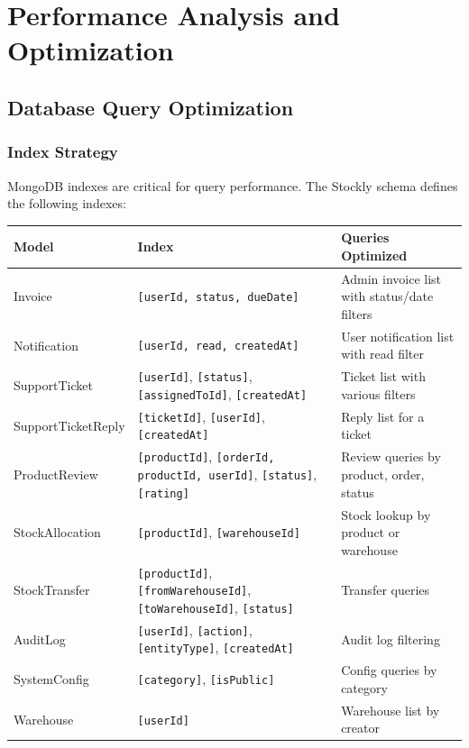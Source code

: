 \documentclass[12pt,onecolumn]{IEEEtran}
\let\oldsection\section
\renewcommand{\section}{\clearpage\oldsection}
\begin{document}
\section{Performance Analysis and Optimization}


\subsection{Database Query Optimization}

\subsubsection{Index Strategy}

MongoDB indexes are critical for query performance. The Stockly schema defines the following indexes:

\begin{center}
\begin{longtable}{llp{6cm}}
  \toprule
  \textbf{Model} & \textbf{Index} & \textbf{Queries Optimized} \\
  \midrule
  \endhead
  Invoice        & \texttt{[userId, status, dueDate]} & Admin invoice list with status/date filters \\
  Notification   & \texttt{[userId, read, createdAt]} & User notification list with read filter \\
  SupportTicket  & \texttt{[userId]}, \texttt{[status]}, \texttt{[assignedToId]}, \texttt{[createdAt]} & Ticket list with various filters \\
  SupportTicketReply & \texttt{[ticketId]}, \texttt{[userId]}, \texttt{[createdAt]} & Reply list for a ticket \\
  ProductReview  & \texttt{[productId]}, \texttt{[orderId, productId, userId]}, \texttt{[status]}, \texttt{[rating]} & Review queries by product, order, status \\
  StockAllocation & \texttt{[productId]}, \texttt{[warehouseId]} & Stock lookup by product or warehouse \\
  StockTransfer  & \texttt{[productId]}, \texttt{[fromWarehouseId]}, \texttt{[toWarehouseId]}, \texttt{[status]} & Transfer queries \\
  AuditLog       & \texttt{[userId]}, \texttt{[action]}, \texttt{[entityType]}, \texttt{[createdAt]} & Audit log filtering \\
  SystemConfig   & \texttt{[category]}, \texttt{[isPublic]} & Config queries by category \\
  Warehouse      & \texttt{[userId]} & Warehouse list by creator \\
  \bottomrule
\end{longtable}
\end{center}
\end{document}
